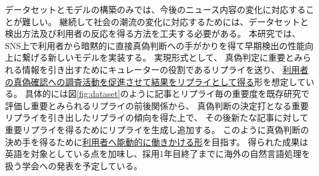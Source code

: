 \vspace{20pt}
データセットとモデルの構築のみでは、今後のニュース内容の変化に対応することが難しい。
継続して社会の潮流の変化に対応するためには、データセットと検出方法及び利用者の反応を得る方法を工夫する必要がある。
本研究では、SNS上で利用者から暗黙的に直接真偽判断への手がかりを得て早期検出の性能向上に繋げる新しいモデルを実装する。
実現形式として、
真偽判定に重要とみられる情報を引き出すためにキュレーターの役割であるリプライを送り、
\underline{利用者の真偽確認への調査活動を促進させて結果をリプライとして得る}形を想定している。
具体的には図\ref{fig:dataset}のように記事とリプライ毎の重要度を既存研究\cite{shu2019kdd}で評価し重要とみられるリプライの前後関係から、
真偽判断の決定打となる重要リプライを引き出したリプライの傾向を得た上で、
その後新たな記事に対して重要リプライを得るためにリプライを生成し追加する。
このように真偽判断の決め手を得るために\underline{利用者へ能動的に働きかける形}を目指す。
得られた成果は英語を対象としている点を加味し、採用1年目終了までに海外の自然言語処理を扱う学会への発表を予定している。

